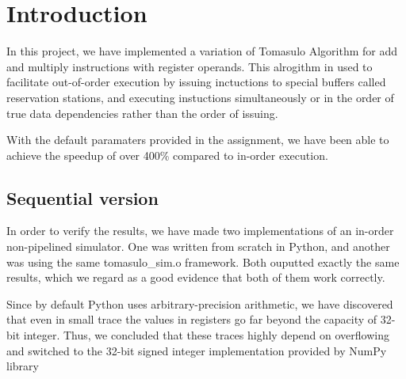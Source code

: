 \section{Introduction}

In this project, we have implemented a variation of Tomasulo Algorithm for add and multiply instructions with register operands. This alrogithm in used to facilitate out-of-order execution by issuing inctuctions to special buffers called reservation stations, and executing instuctions simultaneously or in the order of true data dependencies rather than the order of issuing.

With the default paramaters provided in the assignment, we have been able to achieve the speedup of over 400\% compared to in-order execution.

\subsection{Sequential version}

In order to verify the results, we have made two implementations of an in-order non-pipelined simulator. One was written from scratch in Python, and another was using the same tomasulo\_sim.o framework. Both ouputted exactly the same results, which we regard as a good evidence that both of them work correctly.

Since by default Python uses arbitrary-precision arithmetic, we have discovered that even in small trace the values in registers go far beyond the capacity of 32-bit integer. Thus, we concluded that these traces highly depend on overflowing and switched to the 32-bit signed integer implementation provided by NumPy library

